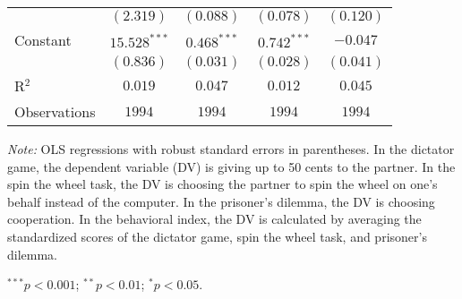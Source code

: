 \begin{table}[!t]
\begin{center}
{\begin{threeparttable}
\begin{tabular}{l c c c c}
                             & $(2.319)$      & $(0.088)$     & $(0.078)$      & $(0.120)$      \\
Constant                     & $15.528^{***}$ & $0.468^{***}$ & $0.742^{***}$  & $-0.047$       \\
                             & $(0.836)$      & $(0.031)$     & $(0.028)$      & $(0.041)$      \\
\midrule
R$^2$                        & $0.019$        & $0.047$       & $0.012$        & $0.045$        \\
Observations                 & $1994$         & $1994$        & $1994$         & $1994$         \\
\bottomrule
\end{tabular}
\begin{tablenotes}[flushleft]
\scriptsize{\item[\hspace{-5mm}] \textit{Note:} OLS regressions with robust standard errors in parentheses. 
                                In the dictator game, the dependent variable (DV) is giving up to 50 cents to the partner. 
                                In the spin the wheel task, the DV is choosing the partner to spin the wheel on one’s behalf instead of the computer. 
                                In the prisoner’s dilemma, the DV is choosing cooperation. 
                                In the behavioral index, the DV is calculated by averaging the standardized scores of the dictator game, spin the wheel task, and prisoner's dilemma. \item[\hspace{-5mm}] $^{***}p<0.001$; $^{**}p<0.01$; $^{*}p<0.05$.}
\end{tablenotes}
\end{threeparttable}
}
\label{tab:behavior_regression_emotional}
\end{center}
\end{table}

\renewcommand{\baselinestretch}{1.67}%
